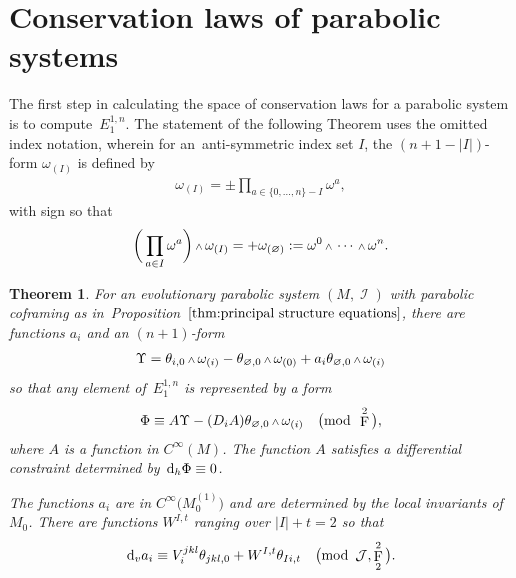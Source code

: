 \documentclass[10pt,a4paper]{amsart}
\DeclareMathOperator{\I}{\mathcal{I}}
\renewcommand{\d}{{\rm d}}
\newcommand{\cinfinity}[1]{C^\infty\big(#1\big)}
\renewcommand{\mod}[1]{\quad\big(\mathrm{mod\enspace} #1\big)}
\newcommand{\w}{{\mathchoice{\,{\scriptstyle\wedge}\,}{{\scriptstyle\wedge}}
 {{\scriptscriptstyle\wedge}}{{\scriptscriptstyle\wedge}}}}
\newcommand{\M}[1]{M_0^{(#1)}}
\newcommand{\thetas}[1]{\theta_{#1}}
\newcommand{\omegas}[1]{\omega_{(#1)}}
\DeclareMathOperator{\pwf}{F}
\renewcommand{\dh}{\ensuremath{\hspace{1pt} \d_h}}
\newcommand{\dv}{\ensuremath{\hspace{1pt} \d_v}}
\newcommand{\cartTheta}{\mathcal{J}}
\newcommand{\cMinfty}{C^\infty(M)}
\numberwithin{equation}{section}
\newtheorem{Theorem}{Theorem}[section]
\begin{document}
\section{Conservation laws of parabolic systems}\label{sec:conservation laws}
The first step in calculating the space of conservation laws for a parabolic system is to com\-pute~$E^{1,n}_1$. The statement of the following Theorem uses the omitted index notation, wherein for an~anti-symmetric index set $I$, the $(n+1-|I|)$-form $\omegas{I}$ is defined by
\begin{gather*}
\omegas{I} = \pm\prod_{a \in \{0,\dots, n\} - I} \omega^a ,
\end{gather*}
with sign so that
\begin{gather*}
\bigg( \prod_{a \in I} \omega^a \bigg) \w \omegas{I} = +\omegas{\varnothing} := \omega^0\w\cdots\w\omega^n .
\end{gather*}
\begin{Theorem}\label{thm:conservation laws linear part}
 For an evolutionary parabolic system $(M,\I)$ with parabolic coframing as in~Pro\-position~$\ref{thm:principal structure equations}$, there are functions $a_i$ and an $(n+1)$-form
 \begin{gather*}
 \Upsilon = \thetas{i,0}\w\omegas{i} - \thetas{\varnothing,0}\w\omegas{0} + a_i\thetas{\varnothing,0}\w\omegas{i}
 \end{gather*}
 so that any element of~$E^{1,n}_1$ is represented by a form
 \begin{gather*}
 \Phi \equiv A\Upsilon - (D_iA) \thetas{\varnothing,0}\w\omegas{i} \mod{\pwf^2},
 \end{gather*}
 where $A$ is a function in $\cMinfty$. The function $A$ satisfies a differential constraint determined by $\dh\Phi \equiv 0$.

 The functions $a_i$ are in $\cinfinity{\M{1}}$ and are determined by the local invariants of~$M_0$. There are functions $W^{I,t}$ ranging over $|I|+t = 2$ so that
 \begin{gather*}
 \dv a_i \equiv V_i^{jkl}\thetas{jkl,0} + W^{I,t}\thetas{Ii,t} \mod{\cartTheta, \pwf^2_2} .
 \end{gather*}
\end{Theorem}
\end{document}
